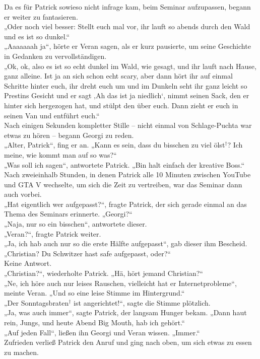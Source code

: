 \documentclass[oneside]{memoir}
\begin{document}
Da es für Patrick sowieso nicht infrage kam, beim Seminar aufzupassen, begann er weiter zu fantasieren. \\
„Oder noch viel besser: Stellt euch mal vor, ihr lauft so abends durch den Wald und es ist so dunkel.“ \\
„Aaaaaaah ja“, hörte er Veran sagen, als er kurz pausierte, um seine Geschichte in Gedanken zu vervollständigen. \\
„Ok, ok, also es ist so echt dunkel im Wald, wie gesagt, und ihr lauft nach Hause, ganz alleine. Ist ja an sich schon echt scary, aber dann hört ihr auf einmal Schritte hinter euch, ihr dreht euch um und im Dunkeln seht ihr ganz leicht so Prestins Gesicht und er sagt ‚Ah das ist ja niedlich‘, nimmt seinen Sack, den er hinter sich hergezogen hat, und stülpt den über euch. Dann zieht er euch in seinen Van und entführt euch.“ \\
Nach einigen Sekunden kompletter Stille -- nicht einmal von Schlage-Puchta war etwas zu hören -- begann Georgi zu reden. \\
„Alter, Patrick“, fing er an. „Kann es sein, dass du bisschen zu viel ölst$^{\dagger}$? Ich meine, wie kommt man auf so was?“ \\
„Was soll ich sagen“, antwortete Patrick. „Bin halt einfach der kreative Boss.“ Nach zweieinhalb Stunden, in denen Patrick alle 10 Minuten zwischen YouTube und GTA V wechselte, um sich die Zeit zu vertreiben, war das Seminar dann auch vorbei. \\
„Hat eigentlich wer aufgepasst?“, fragte Patrick, der sich gerade einmal an das Thema des Seminars erinnerte. „Georgi?“ \\
„Naja, nur so ein bisschen“, antwortete dieser. \\
„Veran?“, fragte Patrick weiter. \\
„Ja, ich hab auch nur so die erste Hälfte aufgepasst“, gab dieser ihm Bescheid. \\
„Christian? Du Schwitzer hast safe aufgepasst, oder?“ \\
Keine Antwort. \\
„Christian?“, wiederholte Patrick. „Hä, hört jemand Christian?“ \\
„Ne, ich höre auch nur leises Rauschen, vielleicht hat er Internetprobleme“, meinte Veran. „Und so eine leise Stimme im Hintergrund.“ \\
„Der Sonntagsbraten$^{\dagger}$ ist angerichtet!“, sagte die Stimme plötzlich. \\
„Ja, was auch immer“, sagte Patrick, der langsam Hunger bekam. „Dann haut rein, Jungs, und heute Abend Big Mouth, hab ich gehört.“ \\
„Auf jeden Fall“, ließen ihn Georgi und Veran wissen. „Immer.“ \\
Zufrieden verließ Patrick den Anruf und ging nach oben, um sich etwas zu essen zu machen.     
     
\end{document}
